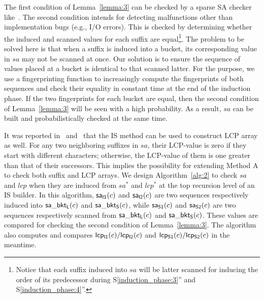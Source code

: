 \documentclass[10pt,journal,compsoc]{IEEEtran}
\begin{document}
The first condition of Lemma~\ref{lemma:3} can be checked by a sparse SA checker like~\cite{wu2017}. The second condition intends for detecting malfunctions other than implementation bugs (e.g., I/O errors). This is checked by determining whether the induced and scanned values for each suffix are equal\footnote{Notice that each suffix induced into $sa$ will be latter scanned for inducing the order of its predecessor during S\ref{induction_phase:3}'' and S\ref{induction_phase:4}''. }. The problem to be solved here is that when a suffix is induced into a bucket, its corresponding value in $sa$ may not be scanned at once. Our solution is to ensure the sequence of values placed at a bucket is identical to that scanned latter. For the purpose, we use a fingerprinting function to increasingly compute the fingerprints of both sequences and check their equality in constant time at the end of the induction phase. If the two fingerprints for each bucket are equal, then the second condition of Lemma~\ref{lemma:3} will be seen with a high probability. As a result, $sa$ can be built and probabilistically checked at the same time. 

It was reported in~\cite{Fischer11} and~\cite{Bingmann12} that the IS method can be used to construct LCP array as well. For any two neighboring suffixes in $sa$, their LCP-value is zero if they start with different characters; otherwise, the LCP-value of them is one greater than that of their successors. This implies the possibility for extending Method A to check both suffix and LCP arrays. We design Algorithm~\ref{alg:2} to check $sa$ and $lcp$ when they are induced from $sa^*$ and $lcp^*$ at the top recursion level of an IS builder. In this algorithm, ${\sf sa_{I1}}(c)$ and ${\sf sa_{I2}}(c)$ are two sequences respectively induced into ${\sf sa\_bkt_L}(c)$ and ${\sf sa\_bkt_S}(c)$, while ${\sf sa_{S1}}(c)$ and ${\sf sa_{S2}}(c)$ are two sequences respectively scanned from ${\sf sa\_bkt_L}(c)$ and ${\sf sa\_bkt_S}(c)$. These values are compared for checking the second condition of Lemma~\ref{lemma:3}. The algorithm also computes and compares ${\sf lcp_{I1}}(c)/{\sf lcp_{I2}}(c)$ and ${\sf lcp_{S1}}(c)/{\sf lcp_{S2}}(c)$ in the meantime. 

\end{document}
